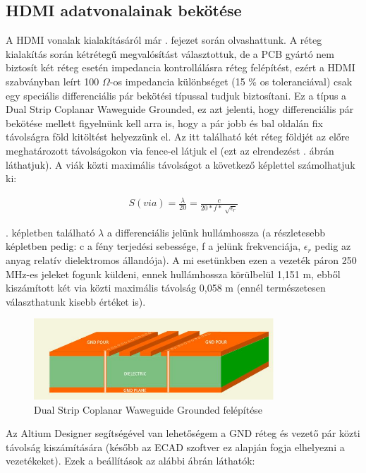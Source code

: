 	\subsection{HDMI adatvonalainak bekötése}
	
	A HDMI vonalak kialakításáról már . fejezet során olvashattunk. A réteg kialakítás során kétrétegű megvalósítást választottuk, de a PCB gyártó nem biztosít két réteg esetén impedancia kontrollálásra réteg felépítést, ezért a HDMI szabványban leírt 100 $\Omega$-os impedancia különbséget (15 \% os toleranciával) csak egy speciális differenciális pár bekötési típussal tudjuk biztosítani. Ez a típus a Dual Strip Coplanar Waweguide Grounded, ez azt jelenti, hogy differenciális pár bekötése mellett figyelnünk kell arra is, hogy a pár jobb és bal oldalán fix távolságra föld kitöltést helyezzünk el. Az itt található két réteg földjét az előre meghatározott távolságokon via fence-el látjuk el (ezt az elrendezést . ábrán láthatjuk). A viák közti maximális távolságot a következő képlettel számolhatjuk ki:
	
	\begin{align}
		\label{mat:via-distance}	
		S(via) = \frac{\lambda}{20} = \frac{c}{20 * f * \sqrt[]{\epsilon_r}}
	\end{align}   
	
	. képletben található $\lambda$ a differenciális jelünk hullámhossza (a részletesebb képletben pedig: c a fény terjedési sebessége, f a jelünk frekvenciája, $\epsilon_r$ pedig az anyag relatív dielektromos állandója). A mi esetünkben ezen a vezeték páron 250 MHz-es jeleket fogunk küldeni, ennek hullámhossza körülbelül 1,151 m, ebből kiszámított két via közti maximális távolság 0,058 m (ennél természetesen választhatunk kisebb értéket is).
	
	\begin{figure}[H]
		\centering
		\includegraphics[width=90mm, keepaspectratio]{figures/coplanar}
		\caption{Dual Strip Coplanar Waweguide Grounded felépítése \cite{coplanar}} 
		\label{fig:coplanar}
	\end{figure}
	
	Az Altium Designer segítségével van lehetőségem a GND réteg és vezető pár közti távolság kiszámítására (később az ECAD szoftver ez alapján fogja elhelyezni a vezetékeket). Ezek a beállítások az alábbi ábrán láthatók:      
	
